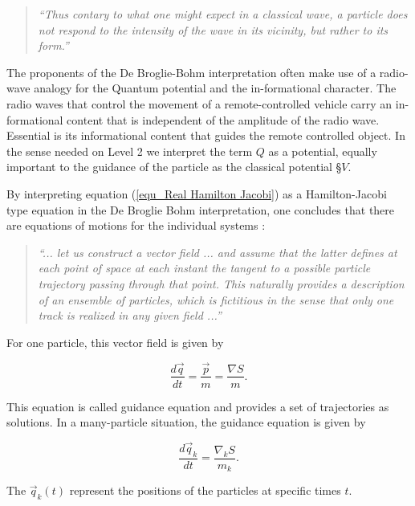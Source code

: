 \documentclass{article}
\begin{document}
\begin{quote}
\textit{``Thus contary to what one might expect in a classical wave, a particle does not respond to the intensity of the wave in its vicinity, but rather to its form.''}
\end{quote}

The proponents of the De Broglie-Bohm interpretation often make use of a radio-wave analogy for the Quantum potential and the in-formational character. The radio waves that control the movement of a remote-controlled vehicle carry an in-formational content that is independent of the amplitude of the radio wave. Essential is its informational content that guides the remote controlled object. In the sense needed on Level 2 we interpret the term $Q$ as a potential, equally important to the guidance of the particle as the classical potential §$V$. \newline

By interpreting equation (\ref{equ_Real Hamilton Jacobi}) as a Hamilton-Jacobi type equation in the De Broglie Bohm interpretation, one concludes that there are equations of motions for the individual systems \cite[]{holland1995quantum}:

\begin{quote}
\textit{``... let us construct a vector field ... and assume that the latter defines at each point of space at each instant the tangent to a possible particle trajectory passing through that point. This naturally provides a description of an ensemble of particles, which is fictitious in the sense that only one track is realized in any given field ...''}
\end{quote}

\newpage

For one particle, this vector field is given by

\begin{equation}
\frac{d\vec q}{dt} = \frac{\vec p}{m} = \frac{\nabla S}{m}.
\end{equation}

This equation is called guidance equation and provides a set of trajectories as solutions. In a many-particle situation, the guidance equation is given by 

\begin{equation}
\frac{d\vec q_k}{dt} = \frac{\nabla_k S}{m_k}.
\end{equation}

The $\vec q_k(t)$ represent the positions of the particles at specific times $t$. \newline
\end{document}
